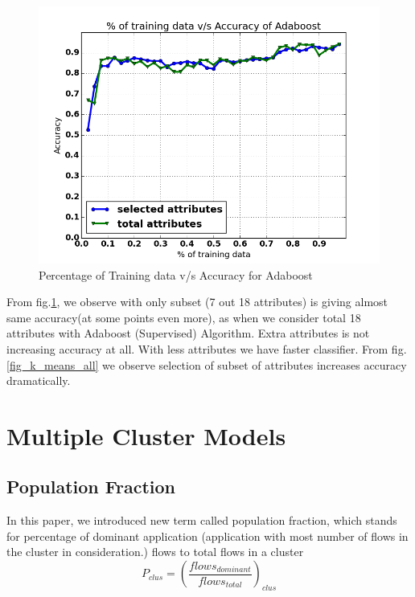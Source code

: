 \documentclass[conference]{IEEEtran}
\begin{document}
\begin{figure}[!t]
	\centering
	\includegraphics[width=1\columnwidth]{selected_total_attr_adaboost}
	\caption{Percentage of Training data v/s Accuracy for Adaboost}
	\label{adaboost_selected_total}
\end{figure}
From fig.\ref{adaboost_selected_total}, we observe with only subset (7 out 18 attributes) is giving almost same accuracy(at some points even more), as when we consider total 18 attributes with Adaboost (Supervised) Algorithm\cite{}. Extra attributes is not increasing accuracy at all. With less attributes we have faster classifier. From fig.\ref{fig_k_means_all} we observe selection of subset of attributes increases accuracy dramatically. 

\section{Multiple Cluster Models}
\label{sec:multi_cluster}
\subsection{Population Fraction}
In this paper, we introduced new term called population fraction, which stands for percentage of dominant application (application with most number of flows in the cluster in consideration.) flows to total flows in a cluster
\begin{equation}
P_{clus} = (\frac{flows_{dominant}}{flows_{total}})_{clus}
\end{equation}
\end{document}
